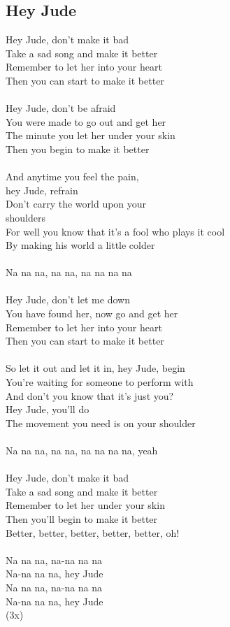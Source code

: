 \documentclass[a5paper]{article}
\begin{document}
\subsection{Hey Jude}
\label{sub:hey_jude}
Hey Jude, don't make it bad \\
Take a sad song and make it better \\
Remember to let her into your heart \\
Then you can start to make it better \\
\\
Hey Jude, don't be afraid \\
You were made to go out and get her \\
The minute you let her under your skin \\
Then you begin to make it better \\
 \\
And anytime you feel the pain, \\
hey Jude, refrain \\
Don't carry the world upon your \\
shoulders \\
For well you know that it's a fool who plays it cool \\
By making his world a little colder \\
 \\
Na na na, na na, na na na na \\
 \\
Hey Jude, don't let me down \\
You have found her, now go and get her \\
Remember to let her into your heart \\
Then you can start to make it better \\
 \\
So let it out and let it in, hey Jude, begin \\
You're waiting for someone to perform with \\
And don't you know that it's just you? \\
Hey Jude, you'll do \\
The movement you need is on your shoulder \\
 \\
Na na na, na na, na na na na, yeah \\
 \\
Hey Jude, don't make it bad \\
Take a sad song and make it better \\
Remember to let her under your skin  \\
Then you'll begin to make it better \\
Better, better, better, better, better, oh! \\
 \\
Na na na, na-na na na \\
Na-na na na, hey Jude \\
Na na na, na-na na na \\
Na-na na na, hey Jude \\
(3x)
\end{document}
